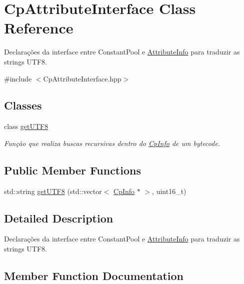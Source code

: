 \hypertarget{struct_cp_attribute_interface}{}\section{Cp\+Attribute\+Interface Class Reference}
\label{struct_cp_attribute_interface}


Declarações da interface entre Constant\+Pool e \hyperlink{class_attribute_info}{Attribute\+Info} para traduzir as strings U\+T\+F8.  




{\ttfamily \#include $<$Cp\+Attribute\+Interface.\+hpp$>$}

\subsection*{Classes}
\begin{DoxyCompactItemize}
\item 
class \hyperlink{class_cp_attribute_interface_1_1get_u_t_f8}{get\+U\+T\+F8}
\begin{DoxyCompactList}\small\item\em Função que realiza buscas recursivas dentro do \hyperlink{class_cp_info}{Cp\+Info} de um bytecode. \end{DoxyCompactList}\end{DoxyCompactItemize}
\subsection*{Public Member Functions}
\begin{DoxyCompactItemize}
\item 
std\+::string \hyperlink{struct_cp_attribute_interface_a99cabbc15a0af5273a6d324dfbc78f41}{get\+U\+T\+F8} (std\+::vector$<$ \hyperlink{class_cp_info}{Cp\+Info} $\ast$ $>$, uint16\+\_\+t)
\end{DoxyCompactItemize}


\subsection{Detailed Description}
Declarações da interface entre Constant\+Pool e \hyperlink{class_attribute_info}{Attribute\+Info} para traduzir as strings U\+T\+F8. 

\subsection{Member Function Documentation}

